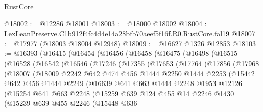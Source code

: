 \begin{lexlean}{RustCore}
\begin{coremodule}
@18002 := @12286 @18001
@18003 := @18000 @18002
@18004 := LexLeanPreserve.C1b912f4fc4d4e14a28bfb70aeef5f16f.R0.RustCore.fal19
@18007 := @17977 (@18003 @18004 @12948)
@18009 := @16627 @1326 @12853
@18103 := @16393
    (@16415
      (@16454
        (@16456
          (@16458
            (@16475
              (@16498
                (@16515
                  (@16528
                    (@16542
                      (@16546
                        (@17246
                          (@17355
                            (@17653
                              (@17764
                                (@17856
                                  (@17968
                                    (@18007
                                      (@18009
                                        @2242
                                        @642
                                        @474
                                        @456
                                        @1444
                                        @2250
                                        @1444
                                        @2253
                                        (@15442
                                          @642
                                          @456
                                          @1444
                                          @2249
                                          (@16639
                                            @641
                                            @663
                                            @1444
                                            @2248
                                            @1953
                                            @12126
                                            (@15254
                                              @641
                                              @663
                                              @2248
                                              (@15259
                                                @639
                                                @124
                                                @455
                                                @14
                                                @2246
                                                @1430
                                                (@15239
                                                  @639
                                                  @455
                                                  @2246
                                                  (@15448
                                                    @636

\end{coremodule}
\end{lexlean}
